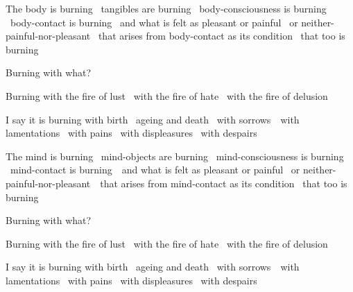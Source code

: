 \begin{english-only-hang}
  The body is burning \breathmark\ tangibles are burning \breathmark\ body-consciousness is burning \breathmark\ body-contact is burning \breathmark\ and what is felt as pleasant or painful \breathmark\ or neither-painful-nor-pleasant \breathmark\ that arises from body-contact as its condition \breathmark\ that too is burning
\end{english-only-hang}
\begin{english-only-hang-together}
  Burning with what?
\end{english-only-hang-together}
\begin{english-only-hang-together}
  Burning with the fire of lust \breathmark\ with the fire of hate \breathmark\ with the fire of delusion
\end{english-only-hang-together}
\begin{english-only-hang-together}
  I say it is burning with birth \breathmark\ ageing and death \breathmark\ with \mbox{sorrows}~\breathmark\ with lamentations \breathmark\ with pains \breathmark\ with displeasures \breathmark\ with despairs
\end{english-only-hang-together}

\ifbfive\clearpage\fi
\ifninebythirteen\clearpage\fi
\ifafive\clearpage\fi

\begin{english-only-hang}
  The mind is burning \breathmark\ mind-objects are burning \breathmark\ mind-consciousness is burning \breathmark\ mind-contact is \mbox{burning}~\breathmark\ and what is felt as pleasant or painful \breathmark\ or neither-painful-nor-{pleasant}~\breathmark\ that arises from mind-contact as its condition \breathmark\ that too is burning
\end{english-only-hang}
\begin{english-only-hang-together}
  Burning with what?
\end{english-only-hang-together}
\begin{english-only-hang-together}
  Burning with the fire of lust \breathmark\ with the fire of hate \breathmark\ with the fire of delusion
\end{english-only-hang-together}
\begin{english-only-hang-together}
  I say it is burning with birth \breathmark\ ageing and death \breathmark\ with \mbox{sorrows}~\breathmark\ with lamentations \breathmark\ with pains \breathmark\ with displeasures \breathmark\ with despairs
\end{english-only-hang-together}


